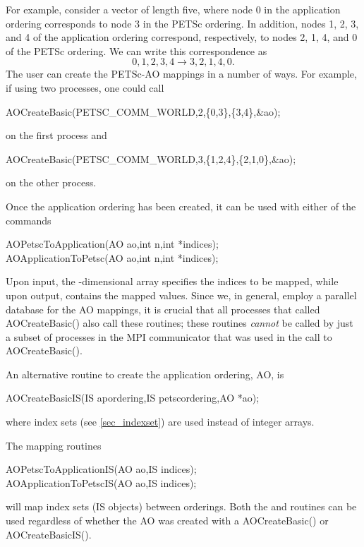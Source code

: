 For example, consider a vector of length five, where node 0 in the application ordering
corresponds to node 3 in the PETSc ordering.  In addition, nodes 1, 2, 3, and 4 of
the application ordering correspond, respectively, to nodes 2, 1, 4, and 0 of
the PETSc ordering.
We can write this correspondence as
\[
 { 0, 1, 2, 3, 4 }  \to  { 3, 2, 1, 4, 0 }. 
\]
The user can create the PETSc-AO mappings in a number of ways.  For example,
if using two processes, one could call
\begin{tabbing}
  AOCreateBasic(PETSC_COMM_WORLD,2,\{0,3\},\{3,4\},\&ao);
\end{tabbing}
on the first process and 
\begin{tabbing}
 AOCreateBasic(PETSC_COMM_WORLD,3,\{1,2,4\},\{2,1,0\},\&ao);
\end{tabbing}
on the other process.

Once the application ordering has been created, it can be used
with either of the commands
\begin{tabbing}
  AOPetscToApplication(AO ao,int n,int *indices);\\
  AOApplicationToPetsc(AO ao,int n,int *indices);
\end{tabbing}
Upon input, the -dimensional array  specifies 
the indices to be mapped, while upon output,  contains
the mapped values.
Since we, in general, employ a parallel database for the
AO mappings, it is crucial that all processes that
called AOCreateBasic() also call these routines; these
routines {\em cannot} be called by just a subset of processes
in the MPI communicator that was used in the call to AOCreateBasic().

An alternative routine to create the application ordering, AO, is 
\begin{tabbing}
  AOCreateBasicIS(IS apordering,IS petscordering,AO *ao);
\end{tabbing}
where index sets (see \ref{sec_indexset}) are used instead of integer arrays. 

The 
mapping routines 
\begin{tabbing}
  AOPetscToApplicationIS(AO ao,IS indices);\\
  AOApplicationToPetscIS(AO ao,IS indices);
\end{tabbing}
will map index sets (IS objects) between orderings. Both the  and 
 routines can be used regardless of whether the AO was 
created with a AOCreateBasic() or AOCreateBasicIS().

